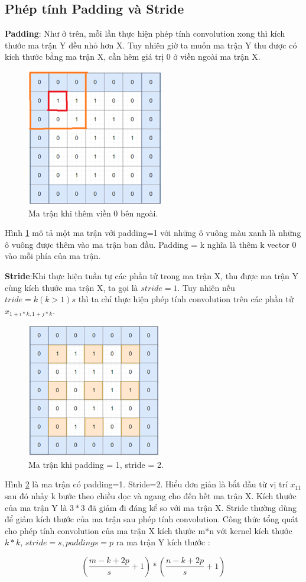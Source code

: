 \subsection{Phép tính Padding và Stride}
\textbf{Padding}: Như ở trên, mỗi lần thực hiện phép tính convolution xong thì kích thước ma trận Y đều nhỏ hơn X. Tuy nhiên giờ ta muốn ma trận Y thu được có kích thước bằng ma trận X, cần hêm giá trị 0 ở viền ngoài ma trận X.\par
\begin{figure}[ht!]
\centerline{\includegraphics[scale=0.6]{images/neural4.png}}
\caption{Ma trận khi thêm viền 0 bên ngoài.}
\label{fig:neural4}
\end{figure}
Hình \ref{fig:neural4} mô tả một ma trận với padding=1 với những ô vuông màu xanh là những ô vuông được thêm vào ma trận ban đầu. Padding = k nghĩa là thêm k vector 0 vào mỗi phía của ma trận.\par
\textbf{Stride}:Khi thực hiện tuần tự các phần tử trong ma trận X, thu được ma trận Y cùng kích thước ma trận X, ta gọi là $stride = 1$. Tuy nhiên nếu $tride=k (k > 1)s$ thì ta chỉ thực hiện phép tính convolution trên các phần tử $x_{1+i*k,1+j*k}$.\par
\begin{figure}[ht!]
\centerline{\includegraphics[scale=0.5]{images/neural5.png}}
\caption{Ma trận khi padding = 1, stride = 2.}
\label{fig:neural5}
\end{figure}
Hình \ref{fig:neural5} là ma trận có padding=1. Stride=2. Hiểu đơn giản là bắt đầu từ vị trí $x_{11}$ sau đó nhảy k bước theo chiều dọc và ngang cho đến hết ma trận X. Kích thước của ma trận Y là $3*3$ đã giảm đi đáng kể so với ma trận X. Stride thường dùng để giảm kích thước của ma trận sau phép tính convolution. Công thức tổng quát cho phép tính convolution của ma trận X kích thước m*n với kernel kích thước $k*k$, $stride = s, padding s = p$ ra ma trận Y kích thước :\par
\begin{equation}
\left( \dfrac{m-k+2p}{s}+1\right) *\left( \dfrac{n-k+2p}{s}+1\right) 
\end{equation}
